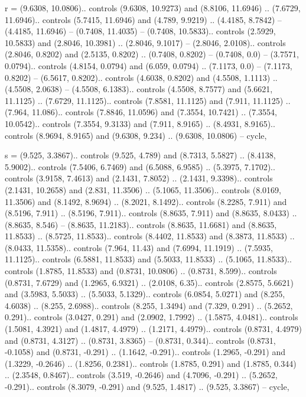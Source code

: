 r = {(9.6308, 10.0806).. controls (9.6308, 10.9273) and (8.8106, 11.6946) .. (7.6729, 11.6946).. controls (5.7415, 11.6946) and (4.789, 9.9219) .. (4.4185, 8.7842) -- (4.4185, 11.6946) -- (0.7408, 11.4035) -- (0.7408, 10.5833).. controls (2.5929, 10.5833) and (2.8046, 10.3981) .. (2.8046, 9.1017) -- (2.8046, 2.0108).. controls (2.8046, 0.8202) and (2.5135, 0.8202) .. (0.7408, 0.8202) -- (0.7408, 0.0) -- (3.7571, 0.0794).. controls (4.8154, 0.0794) and (6.059, 0.0794) .. (7.1173, 0.0) -- (7.1173, 0.8202) -- (6.5617, 0.8202).. controls (4.6038, 0.8202) and (4.5508, 1.1113) .. (4.5508, 2.0638) -- (4.5508, 6.1383).. controls (4.5508, 8.7577) and (5.6621, 11.1125) .. (7.6729, 11.1125).. controls (7.8581, 11.1125) and (7.911, 11.1125) .. (7.964, 11.086).. controls (7.8846, 11.0596) and (7.3554, 10.7421) .. (7.3554, 10.0542).. controls (7.3554, 9.3133) and (7.911, 8.9165) .. (8.4931, 8.9165).. controls (8.9694, 8.9165) and (9.6308, 9.234) .. (9.6308, 10.0806) -- cycle},

s = {(9.525, 3.3867).. controls (9.525, 4.789) and (8.7313, 5.5827) .. (8.4138, 5.9002).. controls (7.5406, 6.7469) and (6.5088, 6.9585) .. (5.3975, 7.1702).. controls (3.9158, 7.4613) and (2.1431, 7.8052) .. (2.1431, 9.3398).. controls (2.1431, 10.2658) and (2.831, 11.3506) .. (5.1065, 11.3506).. controls (8.0169, 11.3506) and (8.1492, 8.9694) .. (8.2021, 8.1492).. controls (8.2285, 7.911) and (8.5196, 7.911) .. (8.5196, 7.911).. controls (8.8635, 7.911) and (8.8635, 8.0433) .. (8.8635, 8.546) -- (8.8635, 11.2183).. controls (8.8635, 11.6681) and (8.8635, 11.8533) .. (8.5725, 11.8533).. controls (8.4402, 11.8533) and (8.3873, 11.8533) .. (8.0433, 11.5358).. controls (7.964, 11.43) and (7.6994, 11.1919) .. (7.5935, 11.1125).. controls (6.5881, 11.8533) and (5.5033, 11.8533) .. (5.1065, 11.8533).. controls (1.8785, 11.8533) and (0.8731, 10.0806) .. (0.8731, 8.599).. controls (0.8731, 7.6729) and (1.2965, 6.9321) .. (2.0108, 6.35).. controls (2.8575, 5.6621) and (3.5983, 5.5033) .. (5.5033, 5.1329).. controls (6.0854, 5.0271) and (8.255, 4.6038) .. (8.255, 2.6988).. controls (8.255, 1.3494) and (7.329, 0.291) .. (5.2652, 0.291).. controls (3.0427, 0.291) and (2.0902, 1.7992) .. (1.5875, 4.0481).. controls (1.5081, 4.3921) and (1.4817, 4.4979) .. (1.2171, 4.4979).. controls (0.8731, 4.4979) and (0.8731, 4.3127) .. (0.8731, 3.8365) -- (0.8731, 0.344).. controls (0.8731, -0.1058) and (0.8731, -0.291) .. (1.1642, -0.291).. controls (1.2965, -0.291) and (1.3229, -0.2646) .. (1.8256, 0.2381).. controls (1.8785, 0.291) and (1.8785, 0.344) .. (2.3548, 0.8467).. controls (3.519, -0.2646) and (4.7096, -0.291) .. (5.2652, -0.291).. controls (8.3079, -0.291) and (9.525, 1.4817) .. (9.525, 3.3867) -- cycle},

